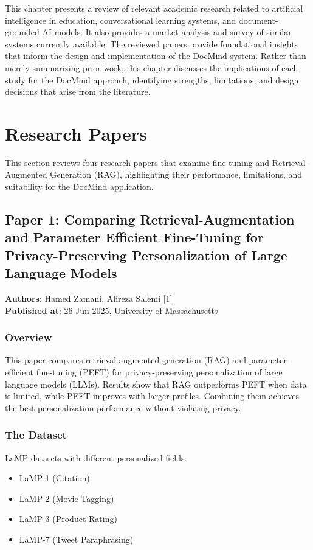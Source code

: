 \documentclass[12pt, a4paper, oneside]{report}
\let\oldsection\section
\renewcommand{\section}{%
  \addtocontents{toc}{\protect\needspace{4\baselineskip}}%
  \oldsection
}
\let\oldsubsection\subsection
\renewcommand{\subsection}{%
  \addtocontents{toc}{\protect\needspace{3\baselineskip}}%
  \oldsubsection
}
\begin{document}
This chapter presents a review of relevant academic research related to artificial intelligence in education, conversational learning systems, and document-grounded AI models. It also provides a market analysis and survey of similar systems currently available. The reviewed papers provide foundational insights that inform the design and implementation of the DocMind system. Rather than merely summarizing prior work, this chapter discusses the implications of each study for the DocMind approach, identifying strengths, limitations, and design decisions that arise from the literature.

\section{Research Papers}

This section reviews four research papers that examine fine-tuning and Retrieval-Augmented Generation (RAG), highlighting their performance, limitations, and suitability for the DocMind application.

\subsection{Paper 1: Comparing Retrieval-Augmentation and Parameter Efficient Fine-Tuning for Privacy-Preserving Personalization of Large Language Models}

\textbf{Authors}: Hamed Zamani, Alireza Salemi [1]\\
\textbf{Published at}: 26 Jun 2025, University of Massachusetts


\subsubsection{Overview}

This paper compares retrieval-augmented generation (RAG) and parameter-efficient fine-tuning (PEFT) for privacy-preserving personalization of large language models (LLMs). Results show that RAG outperforms PEFT when data is limited, while PEFT improves with larger profiles. Combining them achieves the best personalization performance without violating privacy.

\subsubsection{The Dataset}

LaMP datasets with different personalized fields:
\begin{itemize}[noitemsep]
  \item LaMP-1 (Citation)
  \item LaMP-2 (Movie Tagging)
  \item LaMP-3 (Product Rating)
  \item LaMP-7 (Tweet Paraphrasing)
\end{itemize}
\end{document}
